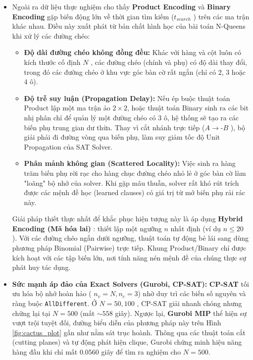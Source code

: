 \documentclass[a4paper,fleqn,numbers]{cas-sc}
\begin{document}
\begin{itemize}
        \item Ngoài ra dữ liệu thực nghiệm cho thấy \textbf{Product Encoding} và \textbf{Binary Encoding}
        gặp biến động lớn về thời gian tìm kiếm ($t_{search}$
        ) trên các ma trận khác nhau. Điều này xuất phát từ bản chất hình học của bài toán N-Queens khi xử lý các đường
        chéo:
        \begin{itemize}
            \item \textbf{Độ dài đường chéo không đồng đều:} Khác với hàng và cột luôn có kích thước cố định $N$
            , các đường chéo (chính và phụ) có độ dài thay đổi, trong đó các đường chéo ở khu vực góc bàn cờ rất ngắn
            (chỉ có 2, 3 hoặc 4 ô).
            \item \textbf{Độ trễ suy luận (Propagation Delay):} Nếu ép buộc thuật toán Product lập một ma trận ảo
            $2 \times 2$, hoặc thuật toán Binary sinh ra các bit nhị phân chỉ để quản lý một đường chéo có $3$
            ô, hệ thống sẽ tạo ra các biến phụ trung gian dư thừa. Thay vì cắt nhánh trực tiếp ($A \to \text{-} B$
            ), bộ giải phải đi đường vòng qua biến phụ, làm suy giảm tốc độ Unit Propagation của SAT Solver.
            \item \textbf{Phân mảnh không gian (Scattered Locality):}
            Việc sinh ra hàng trăm biến phụ rời rạc cho hàng chục đường chéo nhỏ lẻ ở góc bàn cờ làm "loãng" bộ nhớ của
            solver. Khi gặp mâu thuẫn, solver rất khó rút trích được các mệnh đề học (learned clauses) có giá trị từ mớ
            biến phụ rải rác này.
        \end{itemize}

        Giải pháp thiết thực nhất để khắc phục hiện tượng này là áp dụng \textbf{Hybrid Encoding (Mã hóa lai)}
        : thiết lập một ngưỡng $n$ nhất định (ví dụ $n \le 20$
        ). Với các đường chéo ngắn dưới ngưỡng, thuật toán tự động bẻ lái sang dùng phương pháp Binomial (Pairwise) trực
        tiếp. Khung Product/Binary chỉ được kích hoạt với các tập biến lớn, nơi tính năng nén mệnh đề của chúng thực sự
        phát huy tác dụng.

        \item \textbf{Sức mạnh áp đảo của Exact Solvers (Gurobi, CP-SAT):} \textbf{CP-SAT} tối ưu hóa bộ nhớ hoàn hảo (
        $n_v=N, n_c=3$) nhờ duy trì các biến số nguyên và ràng buộc \texttt{AllDifferent}. Ở $N=50, 100$
        , CP-SAT giải nhanh chóng nhưng chững lại tại $N=500$ (mất $\sim 558$ giây). Ngược lại, \textbf{Gurobi MIP}
        thể hiện sự vượt trội tuyệt đối, đường biểu diễn của phương pháp này trên Hình \ref{fig:cactus_plot}
        gần như nằm sát trục hoành. Thông qua các thuật toán cắt (cutting planes) và tự động phát hiện clique, Gurobi
        chứng minh hiệu năng hàng đầu khi chỉ mất $0.0560$ giây để tìm ra nghiệm cho $N=500$.
    \end{itemize}
\end{document}
